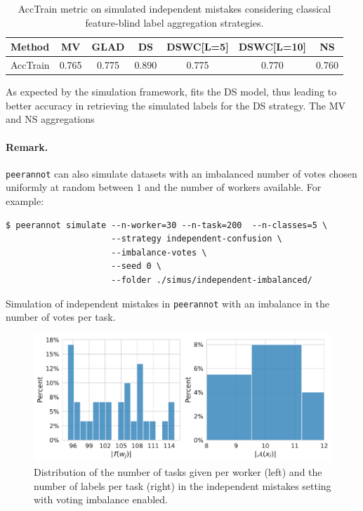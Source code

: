 \begin{table}[htbp]
    \centering
    \caption{AccTrain metric on simulated independent mistakes considering classical feature-blind label aggregation strategies.}
    \label{tab:accuracy_train_indep}
    \begin{tabular}{|l|c|c|c|c|c|c|}
    \hline
    \textbf{Method} & \textbf{MV} & \textbf{GLAD} & \textbf{DS} & \textbf{DSWC[L=5]} & \textbf{DSWC[L=10]} & \textbf{NS} \\
    \hline
    AccTrain & 0.765 & 0.775 & 0.890 & 0.775 & 0.770 & 0.760 \\
    \hline
    \end{tabular}
    \end{table}

As expected by the simulation framework,  fits the DS model, thus leading to better accuracy in retrieving the simulated labels for the DS strategy. The MV and NS aggregations

\paragraph*{Remark.} \texttt{peerannot} can also simulate datasets with an imbalanced number of votes chosen uniformly at random between $1$ and the number of workers available. For example:

\begin{listing}[H]
    \begin{verbatim}
$ peerannot simulate --n-worker=30 --n-task=200  --n-classes=5 \
                     --strategy independent-confusion \
                     --imbalance-votes \
                     --seed 0 \
                     --folder ./simus/independent-imbalanced/
    \end{verbatim}
    \caption{Simulation of independent mistakes in \texttt{peerannot} with an imbalance in the number of votes per task.}
    \label{lst:indep_mistakes_simu_imb}
\end{listing}

\begin{figure}[tbh]
    \centering
    \includegraphics[width=\textwidth]{./images_peerannot/fig-simu2-output-1.pdf}
    \caption{Distribution of the number of tasks given per worker (left) and the number of labels per task (right) in the independent mistakes setting with voting imbalance enabled.}
    \label{fig:desc_independent_imbalance}
\end{figure}

